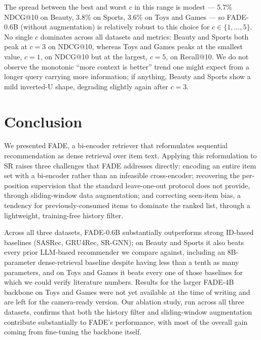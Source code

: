 \documentclass[runningheads]{llncs}
\begin{document}
The spread between the best and worst $c$ in this range is modest --- 5.7\% NDCG@10 on Beauty, 3.8\% on Sports, 3.6\% on Toys and Games --- so FADE-0.6B (without augmentation) is relatively robust to this choice for $c \in \{1,\dots,5\}$. No single $c$ dominates across all datasets and metrics: Beauty and Sports both peak at $c=3$ on NDCG@10, whereas Toys and Games peaks at the smallest value, $c=1$, on NDCG@10 but at the largest, $c=5$, on Recall@10. We do not observe the monotonic ``more context is better'' trend one might expect from a longer query carrying more information; if anything, Beauty and Sports show a mild inverted-U shape, degrading slightly again after $c=3$.

\section{Conclusion}
\label{sec:conclusion}

We presented FADE, a bi-encoder retriever that reformulates sequential recommendation as dense retrieval over item text. Applying this reformulation to SR raises three challenges that FADE addresses directly: encoding an entire item set with a bi-encoder rather than an infeasible cross-encoder; recovering the per-position supervision that the standard leave-one-out protocol does not provide, through sliding-window data augmentation; and correcting seen-item bias, a tendency for previously-consumed items to dominate the ranked list, through a lightweight, training-free history filter.

Across all three datasets, FADE-0.6B substantially outperforms strong ID-based baselines (SASRec, GRU4Rec, SR-GNN); on Beauty and Sports it also beats every prior LLM-based recommender we compare against, including an 8B-parameter dense-retrieval baseline despite having less than a tenth as many parameters, and on Toys and Games it beats every one of those baselines for which we could verify literature numbers. Results for the larger FADE-4B backbone on Toys and Games were not yet available at the time of writing and are left for the camera-ready version. Our ablation study, run across all three datasets, confirms that both the history filter and sliding-window augmentation contribute substantially to FADE's performance, with most of the overall gain coming from fine-tuning the backbone itself.
\end{document}
